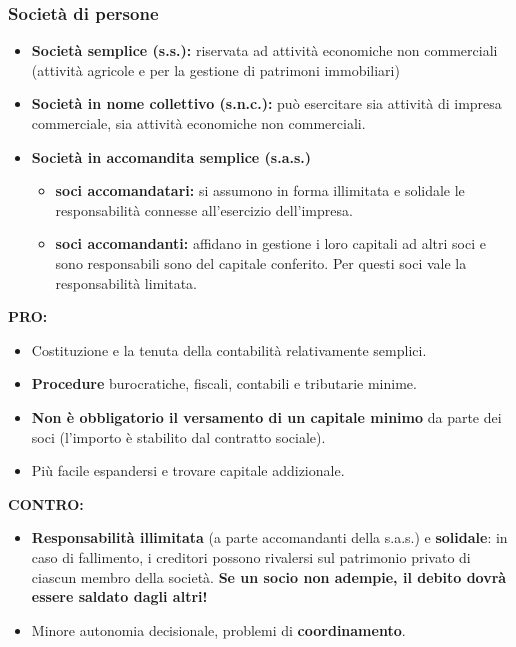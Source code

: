 \documentclass[../main.tex]{subfiles}
\begin{document}
\subsubsection{Società di persone}

\begin{itemize}
	\item \textbf{Società semplice (s.s.):} riservata ad attività economiche non commerciali (attività agricole e per la gestione di patrimoni immobiliari)
	\item \textbf{Società in nome collettivo (s.n.c.):} può esercitare sia attività di impresa commerciale, sia attività economiche non commerciali.
	\item \textbf{Società in accomandita semplice (s.a.s.)}
	      \begin{itemize}
		      \item \textbf{soci accomandatari:} si assumono in forma illimitata e solidale le responsabilità connesse all'esercizio dell'impresa.
		      \item \textbf{soci accomandanti:} affidano in gestione i loro capitali ad altri soci e sono responsabili sono del capitale conferito. Per questi soci vale la responsabilità limitata.

	      \end{itemize}
\end{itemize}

\textbf{PRO:}
\begin{itemize}
	\item Costituzione e la tenuta della contabilità relativamente semplici.

	\item \textbf{Procedure} burocratiche, fiscali, contabili e tributarie minime.

	\item \textbf{Non è obbligatorio il versamento di un capitale minimo} da parte dei soci (l'importo è stabilito dal contratto sociale).

	\item Più facile espandersi e trovare capitale addizionale.

\end{itemize}

\textbf{CONTRO:}
\begin{itemize}
	\item \textbf{Responsabilità illimitata} (a parte accomandanti della s.a.s.) e \textbf{solidale}: in caso di fallimento, i creditori possono rivalersi sul patrimonio privato di ciascun membro della società. \textbf{Se un socio non adempie, il debito dovrà essere saldato dagli altri!}
	\item Minore autonomia decisionale, problemi di \textbf{coordinamento}.

\end{itemize}
\end{document}
